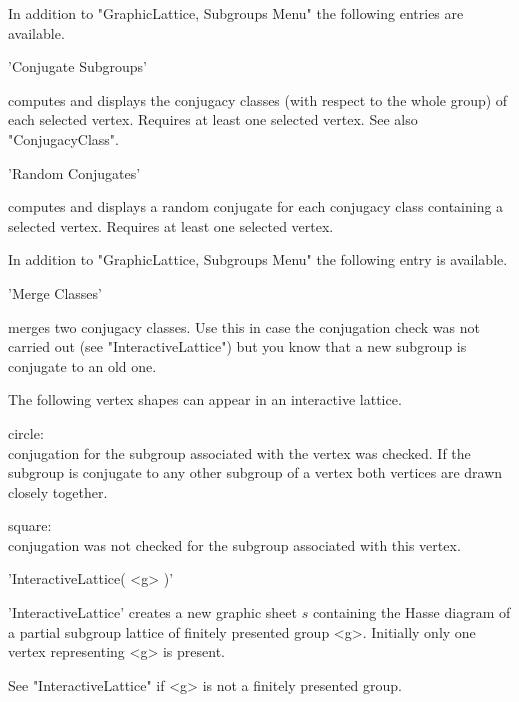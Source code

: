 
In addition to "GraphicLattice, Subgroups Menu" the following entries are
available.

'Conjugate Subgroups'

computes and displays the conjugacy  classes (with  respect to the  whole
group) of each  selected vertex.  Requires  at least one selected vertex.
See also "ConjugacyClass".

'Random Conjugates'

computes and  displays   a  random conjugate  for  each  conjugacy  class
containing a selected vertex.  Requires at least one selected vertex.


In addition  to "GraphicLattice, Subgroups  Menu"  the following entry is
available.

'Merge Classes'

merges two conjugacy classes. Use this in  case the conjugation check was
not  carried out   (see "InteractiveLattice")  but you  know   that a new
subgroup is conjugate to an old one.


The following vertex shapes can appear in an interactive lattice.

circle:\\
    conjugation for the subgroup associated with  the vertex was checked.
    If the subgroup is conjugate  to any other  subgroup of a vertex both
    vertices are drawn closely together.

square:\\
    conjugation was not  checked  for the  subgroup associated with  this
    vertex.


'InteractiveLattice( <g> )'

'InteractiveLattice' creates a new graphic sheet $s$ containing the Hasse
diagram of a  partial subgroup lattice of  finitely presented  group <g>.
Initially only one vertex representing <g> is present.

See "InteractiveLattice" if <g> is not a finitely presented group.

